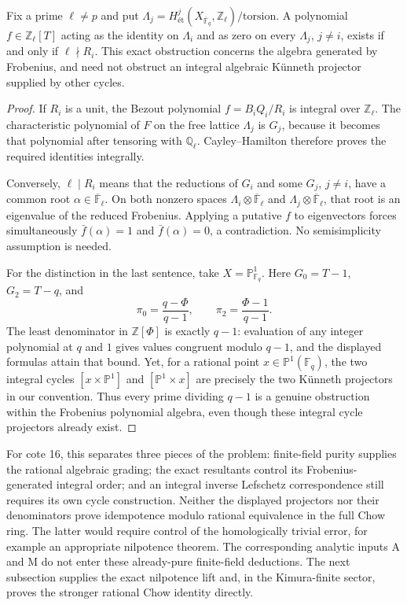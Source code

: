 \begin{proposition}
Fix a prime $\ell\ne p$ and put
$\Lambda_j=H^j_{\text{ét}}(X_{\overline{\mathbb F}_q},
\mathbb Z_\ell)/\mathrm{torsion}$.
A polynomial $f\in\mathbb Z_\ell[T]$ acting as the identity
on $\Lambda_i$ and as zero on every $\Lambda_j$, $j\ne i$,
exists if and only if $\ell\nmid R_i$.
This exact obstruction concerns the algebra generated by
Frobenius, and need not obstruct an integral algebraic
K\"unneth projector supplied by other cycles.
\end{proposition}
\begin{proof}
If $R_i$ is a unit, the Bezout polynomial
$f=B_iQ_i/R_i$ is integral over $\mathbb Z_\ell$.
The characteristic polynomial of $F$ on the free lattice
$\Lambda_j$ is $G_j$, because it becomes that polynomial
after tensoring with $\mathbb Q_\ell$.  Cayley--Hamilton
therefore proves the required identities integrally.

Conversely, $\ell\mid R_i$ means that the reductions of
$G_i$ and some $G_j$, $j\ne i$, have a common root
$\alpha\in\overline{\mathbb F}_\ell$.
On both nonzero spaces
$\Lambda_i\otimes\overline{\mathbb F}_\ell$ and
$\Lambda_j\otimes\overline{\mathbb F}_\ell$, that root
is an eigenvalue of the reduced Frobenius.  Applying a
putative $f$ to eigenvectors forces simultaneously
$\bar f(\alpha)=1$ and $\bar f(\alpha)=0$, a contradiction.
No semisimplicity assumption is needed.

For the distinction in the last sentence, take
$X=\mathbb P^1_{\mathbb F_q}$.  Here
$G_0=T-1$, $G_2=T-q$, and
\[
 \pi_0=\frac{q-\Phi}{q-1},\qquad
 \pi_2=\frac{\Phi-1}{q-1}.
\]
The least denominator in $\mathbb Z[\Phi]$ is exactly
$q-1$: evaluation of any integer polynomial at $q$ and
$1$ gives values congruent modulo $q-1$, and the displayed
formulas attain that bound.  Yet, for a rational point
$x\in\mathbb P^1(\mathbb F_q)$, the two integral cycles
$[x\times\mathbb P^1]$ and $[\mathbb P^1\times x]$
are precisely the two K\"unneth projectors in our convention.
Thus every prime dividing $q-1$ is a genuine obstruction
within the Frobenius polynomial algebra, even though these
integral cycle projectors already exist.
\end{proof}

For cote 16, this separates three pieces of the problem:
finite-field purity supplies the rational algebraic grading;
the exact resultants control its Frobenius-generated integral
order; and an integral inverse Lefschetz correspondence still
requires its own cycle construction.  Neither the displayed
projectors nor their denominators prove idempotence modulo
rational equivalence in the full Chow ring.  The latter
would require control of the homologically trivial error,
for example an appropriate nilpotence theorem.  The
corresponding analytic inputs A and M do not enter these
already-pure finite-field deductions.  The next subsection
supplies the exact nilpotence lift and, in the Kimura-finite
sector, proves the stronger rational Chow identity directly.

